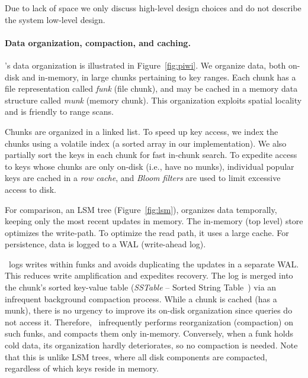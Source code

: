 
Due to lack of space we only discuss high-level design choices and do not describe the system low-level design.

\paragraph{Data organization, compaction, and caching.}
\sys's data organization is illustrated in Figure~\ref{fig:piwi}. 
We organize data, both on-disk and in-memory, in large chunks pertaining to  key ranges.  
Each chunk has a file representation called  \emph{funk} (file chunk), and may be cached in a  memory data structure called \emph{munk} (memory chunk).
This organization exploits spatial locality and is friendly to range scans.

Chunks are organized in a linked list. To speed up key access, 
we index the chunks using a volatile index (a sorted array in our implementation).  
We also partially sort the keys in each chunk for fast in-chunk search.  
 To expedite access to  keys whose chunks are only on-disk  (i.e., have no munks), 
individual popular keys are cached in a \emph{row cache}, 
and \emph{Bloom filters} are used to limit excessive access to disk. 

For comparison, an LSM tree (Figure~\ref{fig:lsm}), organizes data temporally, keeping only the most recent updates in memory.
The in-memory (top level) store optimizes the write-path. To optimize the read path, it uses a large cache.   
For persistence, data is logged to a WAL (write-ahead log). 

\sys\ logs writes within funks and avoids duplicating the updates  in a separate WAL. This reduces write amplification and expedites recovery. 
The  log is merged into the chunk's sorted key-value table (\emph{SSTable} -- Sorted String Table~\cite{Bigtable2008}) 
via an infrequent background compaction process. 
While a chunk is cached (has a munk), there is no urgency to improve its on-disk organization since 
queries do not access it. Therefore, \sys\ infrequently performs reorganization (compaction) on such funks,
and compacts them only in-memory.
Conversely, when a funk holds cold data, its organization hardly deteriorates, so no compaction is needed.
Note that this is unlike LSM trees, where all disk components are compacted, regardless of which keys reside in memory.

